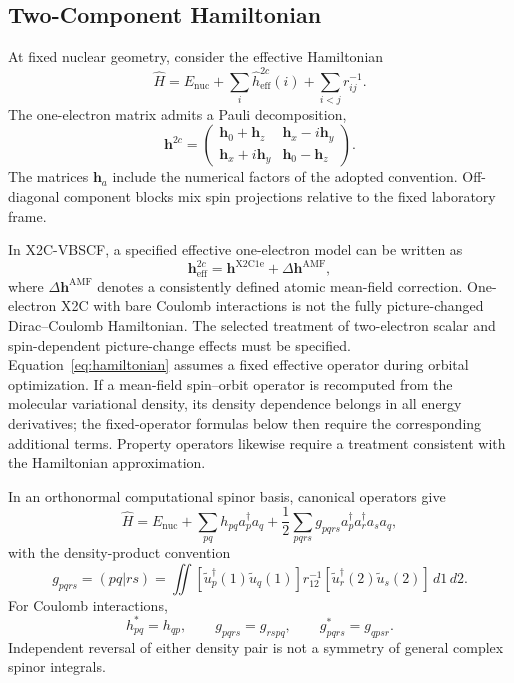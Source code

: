 \documentclass[12pt]{article}
\begin{document}
\subsection{Two-Component Hamiltonian}

At fixed nuclear geometry, consider the effective Hamiltonian
\begin{equation}
 \hat H=E_{\mathrm{nuc}}+\sum_i\hat h_{\mathrm{eff}}^{2c}(i)
                       +\sum_{i<j}r_{ij}^{-1}.
 \label{eq:hamiltonian}
\end{equation}
The one-electron matrix admits a Pauli decomposition,
\begin{equation}
 \mathbf h^{2c}=\begin{pmatrix}
 \mathbf h_0+\mathbf h_z&\mathbf h_x-i\mathbf h_y\\
 \mathbf h_x+i\mathbf h_y&\mathbf h_0-\mathbf h_z
 \end{pmatrix}.
 \label{eq:pauli}
\end{equation}
The matrices \(\mathbf h_a\) include the numerical factors of the adopted convention. Off-diagonal component blocks mix spin projections relative to the fixed laboratory frame.

In X2C-VBSCF, a specified effective one-electron model can be written as
\begin{equation}
 \mathbf h_{\mathrm{eff}}^{2c}
 =\mathbf h^{\mathrm{X2C1e}}+\Delta\mathbf h^{\mathrm{AMF}},
 \label{eq:x2cmodel}
\end{equation}
where \(\Delta\mathbf h^{\mathrm{AMF}}\) denotes a consistently defined atomic mean-field correction. One-electron X2C with bare Coulomb interactions is not the fully picture-changed Dirac--Coulomb Hamiltonian. The selected treatment of two-electron scalar and spin-dependent picture-change effects must be specified.\cite{knecht2022} Equation~\eqref{eq:hamiltonian} assumes a fixed effective operator during orbital optimization. If a mean-field spin--orbit operator is recomputed from the molecular variational density, its density dependence belongs in all energy derivatives; the fixed-operator formulas below then require the corresponding additional terms. Property operators likewise require a treatment consistent with the Hamiltonian approximation.

In an orthonormal computational spinor basis, canonical operators give
\begin{equation}
 \hat H=E_{\mathrm{nuc}}+\sum_{pq}h_{pq}a_p^\dagger a_q
       +\frac12\sum_{pqrs}g_{pqrs}a_p^\dagger a_r^\dagger a_s a_q,
 \label{eq:secondquantized}
\end{equation}
with the density-product convention
\begin{equation}
 g_{pqrs}=(pq|rs)=\iint
 [\widetilde u_p^\dagger(1)\widetilde u_q(1)]r_{12}^{-1}
 [\widetilde u_r^\dagger(2)\widetilde u_s(2)]\,d1\,d2.
 \label{eq:eri}
\end{equation}
For Coulomb interactions,
\begin{equation}
 h_{pq}^*=h_{qp},\qquad
 g_{pqrs}=g_{rspq},\qquad g_{pqrs}^*=g_{qpsr}.
 \label{eq:complexsymmetry}
\end{equation}
Independent reversal of either density pair is not a symmetry of general complex spinor integrals.
\end{document}
